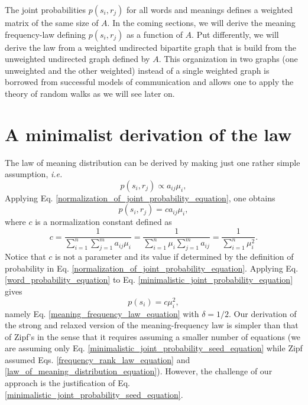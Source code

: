 \documentclass{article}
\begin{document}
The joint probabilities $p(s_i, r_j)$ for all words and meanings defines a weighted matrix of the same size of $A$. 
In the coming sections, we will derive the meaning frequency-law defining $p(s_i, r_j)$ as a function of $A$.
Put differently, we will derive the law from a weighted undirected bipartite graph that is build from the unweighted undirected graph defined by $A$. This organization in two graphs (one unweighted and the other weighted) instead of a single weighted graph is borrowed from successful models of communication \cite{Ferrer2013g} and allows one to apply the theory of random walks \cite{Sinatra2011a,Gomez-Gardenes2008a} as we will see later on.

\section*{A minimalist derivation of the law}

The law of meaning distribution can be derived by making just one rather simple assumption, {\em i.e.}
\begin{equation}
p(s_i, r_j) \propto a_{ij}\mu_i,
\label{minimalistic_joint_probability_seed_equation}
\end{equation}
Applying Eq. \ref{normalization_of_joint_probability_equation}, one obtains 
\begin{equation}
p(s_i, r_j) = c a_{ij}\mu_i,
\label{minimalistic_joint_probability_equation}
\end{equation}
where $c$ is a normalization constant defined as
\begin{equation*}
c = \frac{1}{\sum_{i=1}^n \sum_{j=1}^m a_{ij}\mu_i} = \frac{1}{\sum_{i=1}^n \mu_i \sum_{j=1}^m a_{ij}} = \frac{1}{\sum_{i=1}^n \mu_i^2}.
\end{equation*}
Notice that $c$ is not a parameter and its value if determined by the definition of probability in Eq. \ref{normalization_of_joint_probability_equation}.
Applying Eq. \ref{word_probability_equation} to Eq. \ref{minimalistic_joint_probability_equation} gives 
\begin{equation*}
p(s_i) = c \mu_i^2,
\end{equation*}
namely Eq. \ref{meaning_frequency_law_equation} with $\delta = 1/2$.
Our derivation of the strong and relaxed version of the meaning-frequency law is simpler than that of Zipf's in the sense that it requires assuming a smaller number of equations (we are assuming only Eq. \ref{minimalistic_joint_probability_seed_equation} while Zipf assumed Eqs. \ref{frequency_rank_law_equation} and \ref{law_of_meaning_distribution_equation}). However, the challenge of our approach is the justification of Eq. \ref{minimalistic_joint_probability_seed_equation}. 
\end{document}
